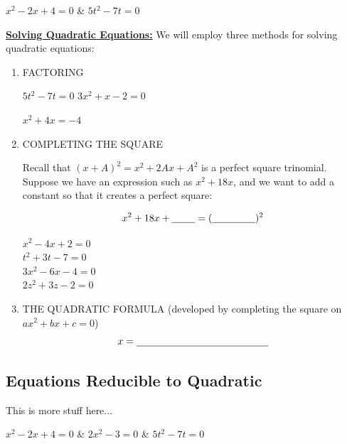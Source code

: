 \begin{examplestwocolumns}
  \ex $x^2-2x+4=0$ &
  \ex $5t^2-7t=0$ \\[.5in]
\end{examplestwocolumns}

\noindent \underline{\textbf{Solving Quadratic Equations:}} 
We will employ three methods for solving quadratic equations:
\begin{enumerate}
\item FACTORING
\begin{examples}
  \ex $5t^2-7t=0$ \vspace{.75in}
  \ex  $3x^2+x-2=0$ \vspace{.75in}

  \ex $x^2+4x=-4$ \vspace{0.75in}
\end{examples}
\item COMPLETING THE SQUARE

Recall that $(x+A)^2 = x^2 + 2Ax + A^2$ is a perfect square trinomial.  Suppose we have an expression such as $x^2+18x$, and we want to add a constant so that it creates a perfect square:

$$x^2+18x+\underline{\ \ \ \ \ \ \ } = (\underline{\ \ \ \ \ \ \ \ \ \ \ \ \ })^2$$

\begin{examples}
  \ex $x^2-4x+2=0$ \\[1in]
  \ex $t^2+3t-7=0$ \\[1in]
  \ex $3x^2-6x-4=0$\\[1in]
  \ex $2z^2+3z-2=0$\\[1in]
\end{examples}
\item THE QUADRATIC FORMULA (developed by completing the square on $ax^2+bx+c=0$)\\[.25in]
$$x=\underline{\ \ \ \ \ \ \ \ \ \ \ \ \ \ \ \ \ \ \ \ \ \ \ \ \ \ \ \ \ \ \ \ \ \ \ \ \ \ \ \ }$$

\end{enumerate}

\subsection*{Equations Reducible to Quadratic}

This is more stuff here...


\begin{examplesthreecolumns}
  \ex $x^2-2x+4=0$ &
  \ex $2x^2 - 3=0$ &
  \ex $5t^2-7t=0$ \\[.5in]
\end{examplesthreecolumns}



